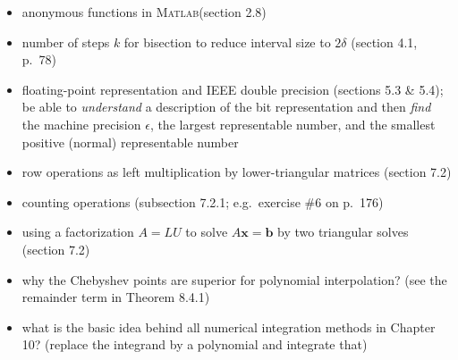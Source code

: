 \documentclass[12pt]{amsart}
\newcommand{\bb}{\mathbf{b}}
\newcommand{\bx}{\mathbf{x}}
\newcommand{\eps}{\epsilon}
\newcommand{\Matlab}{\textsc{Matlab}\xspace}
\begin{document}
  \begin{itemize}
  \item anonymous functions in \Matlab (section 2.8)
  \item number of steps $k$ for bisection to reduce interval size to $2\delta$ (section 4.1, p.~78)
  \item floating-point representation and IEEE double precision (sections 5.3 \& 5.4); be able to \emph{understand} a description of the bit representation and then \emph{find} the machine precision $\eps$, the largest representable number, and the smallest positive (normal) representable number
  \item row operations as left multiplication by lower-triangular matrices (section 7.2)
  \item counting operations (subsection 7.2.1; e.g.~exercise \#6 on p.~176)
  \item using a factorization $A=LU$ to solve $A\bx=\bb$ by two triangular solves (section 7.2)
  \item why the Chebyshev points are superior for polynomial interpolation? (see the remainder term in Theorem 8.4.1)
  \item what is the basic idea behind all numerical integration methods in Chapter 10?  (replace the integrand by a polynomial and integrate that)
  \end{itemize}
\end{document}
